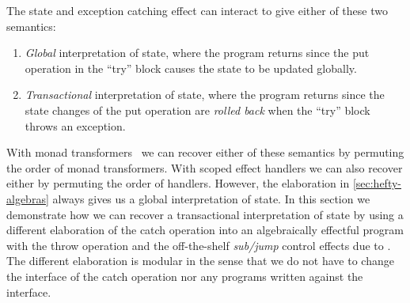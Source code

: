 The state and exception catching effect can interact to give either of these two semantics:
\begin{enumerate}
\item \emph{Global} interpretation of state, where the  program returns  since the \ac{put} operation in the ``try'' block causes the state to be updated globally.
\item \emph{Transactional} interpretation of state, where the  program returns  since the state changes of the \ac{put} operation are \emph{rolled back} when the ``try'' block throws an exception.
\end{enumerate}
%
With monad transformers~\citep{cenciarelli1993syntactic,Liang1995monad} we can recover either of these semantics by permuting the order of monad transformers.
With scoped effect handlers we can also recover either by permuting the order of handlers.
However, the  elaboration in \cref{sec:hefty-algebras} always gives us a global interpretation of state.
In this section we demonstrate how we can recover a transactional interpretation of state by using a different elaboration of the \ac{catch} operation into an algebraically effectful program with the \ac{throw} operation and the off-the-shelf \emph{sub/jump} control effects due to \citet{thielecke1997phd,DBLP:conf/csl/FioreS14}.
The different elaboration is modular in the sense that we do not have to change the interface of the catch operation nor any programs written against the interface.

